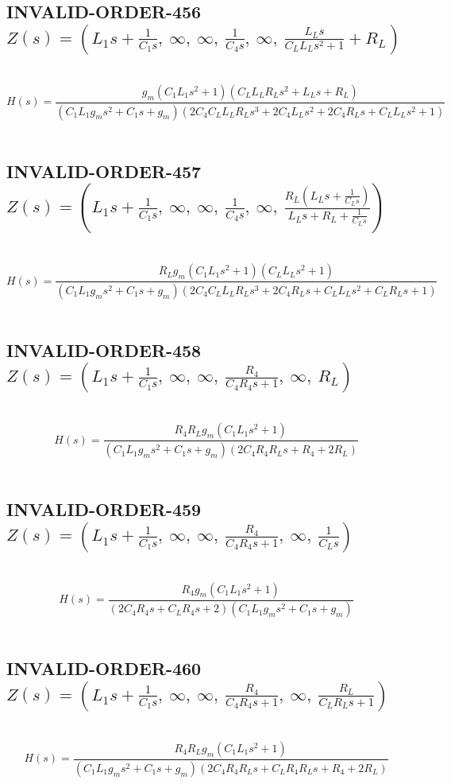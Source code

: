 \documentclass{article}
\begin{document}
\subsection{INVALID-ORDER-456 $Z(s) = \left( L_{1} s + \frac{1}{C_{1} s}, \  \infty, \  \infty, \  \frac{1}{C_{4} s}, \  \infty, \  \frac{L_{L} s}{C_{L} L_{L} s^{2} + 1} + R_{L}\right)$ } \ 
\textbf{\[H(s) = \frac{g_{m} \left(C_{1} L_{1} s^{2} + 1\right) \left(C_{L} L_{L} R_{L} s^{2} + L_{L} s + R_{L}\right)}{\left(C_{1} L_{1} g_{m} s^{2} + C_{1} s + g_{m}\right) \left(2 C_{4} C_{L} L_{L} R_{L} s^{3} + 2 C_{4} L_{L} s^{2} + 2 C_{4} R_{L} s + C_{L} L_{L} s^{2} + 1\right)}\] } \ 
\subsection{INVALID-ORDER-457 $Z(s) = \left( L_{1} s + \frac{1}{C_{1} s}, \  \infty, \  \infty, \  \frac{1}{C_{4} s}, \  \infty, \  \frac{R_{L} \left(L_{L} s + \frac{1}{C_{L} s}\right)}{L_{L} s + R_{L} + \frac{1}{C_{L} s}}\right)$ } \ 
\textbf{\[H(s) = \frac{R_{L} g_{m} \left(C_{1} L_{1} s^{2} + 1\right) \left(C_{L} L_{L} s^{2} + 1\right)}{\left(C_{1} L_{1} g_{m} s^{2} + C_{1} s + g_{m}\right) \left(2 C_{4} C_{L} L_{L} R_{L} s^{3} + 2 C_{4} R_{L} s + C_{L} L_{L} s^{2} + C_{L} R_{L} s + 1\right)}\] } \ 
\subsection{INVALID-ORDER-458 $Z(s) = \left( L_{1} s + \frac{1}{C_{1} s}, \  \infty, \  \infty, \  \frac{R_{4}}{C_{4} R_{4} s + 1}, \  \infty, \  R_{L}\right)$ } \ 
\textbf{\[H(s) = \frac{R_{4} R_{L} g_{m} \left(C_{1} L_{1} s^{2} + 1\right)}{\left(C_{1} L_{1} g_{m} s^{2} + C_{1} s + g_{m}\right) \left(2 C_{4} R_{4} R_{L} s + R_{4} + 2 R_{L}\right)}\] } \ 
\subsection{INVALID-ORDER-459 $Z(s) = \left( L_{1} s + \frac{1}{C_{1} s}, \  \infty, \  \infty, \  \frac{R_{4}}{C_{4} R_{4} s + 1}, \  \infty, \  \frac{1}{C_{L} s}\right)$ } \ 
\textbf{\[H(s) = \frac{R_{4} g_{m} \left(C_{1} L_{1} s^{2} + 1\right)}{\left(2 C_{4} R_{4} s + C_{L} R_{4} s + 2\right) \left(C_{1} L_{1} g_{m} s^{2} + C_{1} s + g_{m}\right)}\] } \ 
\subsection{INVALID-ORDER-460 $Z(s) = \left( L_{1} s + \frac{1}{C_{1} s}, \  \infty, \  \infty, \  \frac{R_{4}}{C_{4} R_{4} s + 1}, \  \infty, \  \frac{R_{L}}{C_{L} R_{L} s + 1}\right)$ } \ 
\textbf{\[H(s) = \frac{R_{4} R_{L} g_{m} \left(C_{1} L_{1} s^{2} + 1\right)}{\left(C_{1} L_{1} g_{m} s^{2} + C_{1} s + g_{m}\right) \left(2 C_{4} R_{4} R_{L} s + C_{L} R_{4} R_{L} s + R_{4} + 2 R_{L}\right)}\] } \ 
\end{document}
